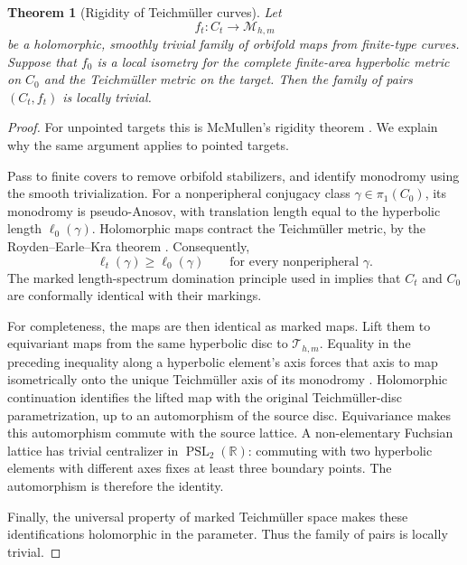 \documentclass[11pt]{article}
\newcommand{\M}{\mathcal M}
\newcommand{\T}{\mathcal T}
\newtheorem{theorem}{Theorem}[section]
\theoremstyle{remark}
\begin{document}
\begin{theorem}[Rigidity of Teichm\"uller curves]\label{thm:McM}
Let
\[
f_t:C_t\longrightarrow \M_{h,m}
\]
be a holomorphic, smoothly trivial family of orbifold maps from
finite-type curves. Suppose that \(f_0\) is a local isometry for
the complete finite-area hyperbolic metric on \(C_0\) and the
Teichm\"uller metric on the target. Then the family of pairs
\((C_t,f_t)\) is locally trivial.
\end{theorem}
\begin{proof}
For unpointed targets this is McMullen's rigidity theorem
\cite[Theorem~1]{McM}. We explain why the same argument applies
to pointed targets.

Pass to finite covers to remove orbifold stabilizers, and
identify monodromy using the smooth trivialization. For a
nonperipheral conjugacy class \(\gamma\in\pi_1(C_0)\), its
monodromy is pseudo-Anosov, with translation length equal to
the hyperbolic length \(\ell_0(\gamma)\). Holomorphic maps
contract the Teichm\"uller metric, by the
Royden--Earle--Kra theorem \cite{Royden,EK}. Consequently,
\[
\ell_t(\gamma)\geq \ell_0(\gamma)
\qquad\text{for every nonperipheral }\gamma.
\]
The marked length-spectrum domination principle used in
\cite[proof of Theorem~1, fact~(1)]{McM} implies that \(C_t\)
and \(C_0\) are conformally identical with their markings.

For completeness, the maps are then identical as marked maps.
Lift them to equivariant maps from the same hyperbolic disc to
\(\T_{h,m}\). Equality in the preceding inequality along a
hyperbolic element's axis forces that axis to map isometrically
onto the unique Teichm\"uller axis of its monodromy
\cite{Bers}. Holomorphic continuation identifies the lifted map
with the original Teichm\"uller-disc parametrization, up to an
automorphism of the source disc. Equivariance makes this
automorphism commute with the source lattice. A non-elementary
Fuchsian lattice has trivial centralizer in
\(\operatorname{PSL}_2(\mathbb R)\): commuting with two
hyperbolic elements with different axes fixes at least three
boundary points. The automorphism is therefore the identity.

Finally, the universal property of marked Teichm\"uller space
makes these identifications holomorphic in the parameter.
Thus the family of pairs is locally trivial.
\end{proof}
\end{document}
